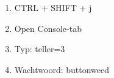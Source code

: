 \begin{enumerate}
  \item CTRL + SHIFT + j
  \item Open Console-tab
  \item Typ: teller=3
  \item Wachtwoord: buttonweed
\end{enumerate}